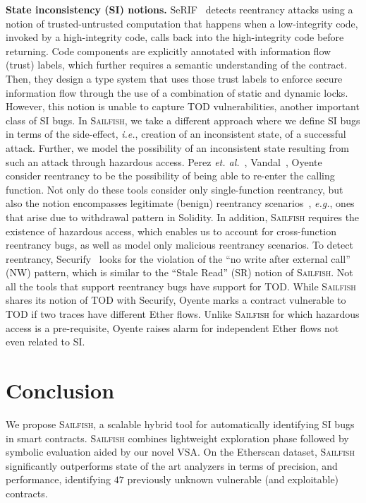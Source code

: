 \documentclass[conference, romanappendices]{tex/IEEEtran}
\theoremstyle{bfnote}
\newcommand{\toolname}{\textsc{Sailfish}\xspace}
\newcommand{\oyente}{{\sc Oyente}\xspace}
\newcommand{\securify}{{\sc Securify}\xspace}
\newcommand{\serif}{{\sc SeRIF}\xspace}
\newcommand{\vandal}{{\sc Vandal}\xspace}
\newcommand{\solidity}{{\sc Solidity}\xspace}
\newcommand{\etherscan}{{\sc Etherscan}\xspace}
\newcommand{\ether}{{Ether}\xspace}
\newcommand{\reentrancy}{{reentrancy}\xspace}
\newcommand{\haz}{{hazardous access}\xspace}
\newcommand{\etal}{\textit{et. al.}}
\newcommand{\eg}{\textit{e.g.}}
\newcommand{\ie}{\textit{i.e.}}
\begin{document}
\noindent
\textbf{State inconsistency (SI) notions.}
\serif~\cite{cecchetti21} detects \reentrancy attacks using a notion of trusted-untrusted computation that happens when a low-integrity code, invoked by a high-integrity code, calls back into the high-integrity code before returning.
Code components are explicitly annotated with information flow (trust) labels, which further requires a semantic understanding of the contract.
Then, they design a type system that uses those trust labels to enforce secure information flow through the use of a combination of static and dynamic locks.
However, this notion is unable to capture {TOD\EndAccSupp{}} vulnerabilities, another important class of 
SI bugs.
In \toolname, we take a different approach where we define SI bugs in terms of the side-effect, \ie, creation of an inconsistent state, of a successful attack.
Further, we model the possibility of an inconsistent state resulting from such an attack through \haz.
{Perez\EndAccSupp{}} \etal~\cite{perez21}, \vandal~\cite{vandal}, \oyente~\cite{oyente} consider \reentrancy to be the possibility of being able to re-enter the calling function.
Not only do these tools consider only single-function \reentrancy, but also the notion encompasses legitimate (benign) \reentrancy scenarios~\cite{sereum}, \eg, ones that arise due to {withdrawal\EndAccSupp{}} pattern in \solidity.
In addition, \toolname requires the existence of \haz, which enables us to account for cross-function \reentrancy bugs, as well as model only malicious \reentrancy scenarios.
To detect \reentrancy, \securify~\cite{securify} looks for the violation of the ``no write after external call'' (NW) pattern, which is similar to the ``{Stale\EndAccSupp{}} Read'' (SR) notion of \toolname.
Not all the tools that support \reentrancy bugs have support for TOD.
While \toolname shares its notion of {TOD\EndAccSupp{}} with \securify, \oyente marks a contract vulnerable to {TOD\EndAccSupp{}} if two traces have different \ether flows.
Unlike \toolname for which \haz is a pre-requisite, \oyente raises alarm for independent \ether flows not even related to SI.
 	\section{Conclusion}
\label{conclusions}
We propose \toolname, a scalable hybrid tool for automatically identifying SI bugs in smart contracts. \toolname combines lightweight exploration phase followed by symbolic evaluation aided by our novel VSA. 
On the \etherscan dataset, \toolname significantly outperforms  state of the art analyzers in terms of precision, and performance, identifying $47$ previously unknown vulnerable (and exploitable) contracts.
\end{document}
